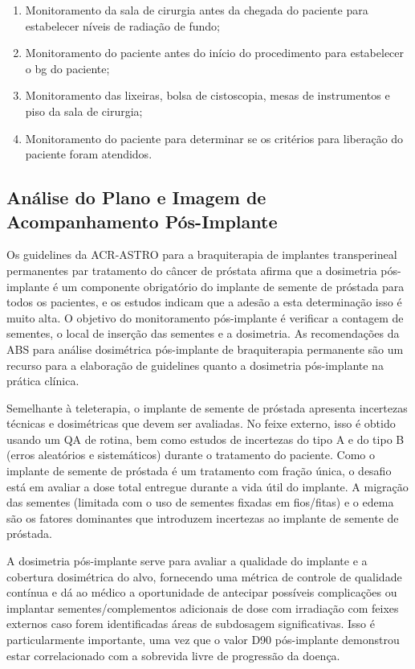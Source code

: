 \documentclass[11pt,a4paper]{article}
\begin{document}
		\begin{enumerate}[label=\textcolor{CarnationPink}{\arabic*${}^\circ$}]
			\item Monitoramento da sala de cirurgia antes da chegada do paciente para estabelecer níveis de radiação de fundo;
			\item Monitoramento do paciente antes do início do procedimento para estabelecer o bg do paciente;
			\item Monitoramento das lixeiras, bolsa de cistoscopia, mesas de instrumentos e piso da sala de cirurgia;
			\item Monitoramento do paciente para determinar se os critérios para liberação do paciente foram atendidos.
		\end{enumerate}

\subsection*{Análise do Plano e Imagem de Acompanhamento Pós-Implante}

	Os guidelines da ACR-ASTRO para a braquiterapia de implantes transperineal permanentes par tratamento do câncer de próstata afirma que a dosimetria pós-implante é um componente obrigatório do implante de semente de próstada para todos os pacientes, e os estudos indicam que a adesão a esta determinação isso é muito alta. O objetivo do monitoramento pós-implante é verificar a contagem de sementes, o local de inserção das sementes e a dosimetria. As recomendações da ABS para análise dosimétrica pós-implante de braquiterapia permanente são um recurso para a elaboração de guidelines quanto a dosimetria pós-implante na prática clínica. 

	Semelhante à teleterapia, o implante de semente de próstada apresenta incertezas técnicas e dosimétricas que devem ser avaliadas. No feixe externo, isso é obtido usando um QA de rotina, bem como estudos de incertezas do tipo A e do tipo B (erros aleatórios e sistemáticos) durante o tratamento do paciente. Como o implante de semente de próstada é um tratamento com fração única, o desafio está em avaliar a dose total entregue durante a vida útil do implante. A migração das sementes (limitada com o uso de sementes fixadas em fios/fitas) e o edema são os fatores dominantes que introduzem incertezas ao implante de semente de próstada.

	A dosimetria pós-implante serve para avaliar a qualidade do implante e a cobertura dosimétrica do alvo, fornecendo uma métrica de controle de qualidade contínua e dá ao médico a oportunidade de antecipar possíveis complicações ou implantar sementes/complementos adicionais de dose com irradiação com feixes externos caso forem identificadas áreas de subdosagem significativas. Isso é particularmente importante, uma vez que o valor D90 pós-implante demonstrou estar correlacionado com a sobrevida livre de progressão da doença. 
\end{document}
